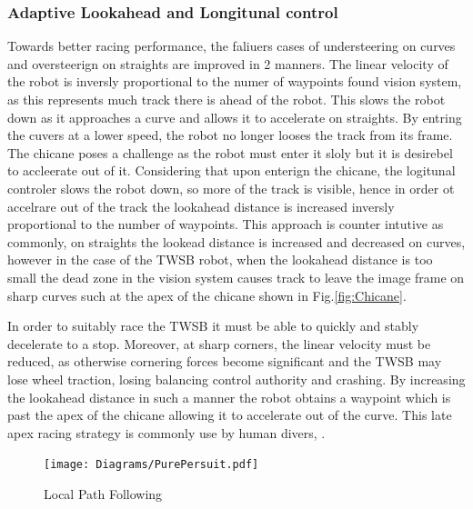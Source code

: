             \subsubsection{Adaptive Lookahead and Longitunal control}
            Towards better racing performance, the faliuers cases of understeering on curves and oversteerign on straights 
            are improved in 2 manners. The linear velocity 
            of the robot is inversly proportional to the numer of waypoints found vision system, as this represents much track there is 
            ahead of the robot.  This slows the robot down as it approaches a curve and allows it to accelerate on straights. 
            By entring the cuvers at a lower speed, the robot no longer looses the track from its frame. The chicane poses a challenge as 
            the robot must enter it sloly but it is desirebel to accleerate out of it. Considering that upon enterign the chicane, 
            the logitunal controler slows the robot down, so more of the track is visible, hence in order ot accelrare out of the track 
            the lookahead distance is increased inversly proportional to the number of waypoints. 
            This approach is counter intutive as commonly, on straights the lookead distance is increased 
            and decreased on curves, however in the case of the TWSB robot, when the lookahead distance is too small the dead zone
            in the vision system causes track to leave the image frame on sharp curves such at the apex of
            the chicane shown in Fig.\ref{fig:Chicane}.

                    
            In order to suitably race the TWSB it must be able to quickly and stably decelerate to a stop. Moreover, at sharp corners, the linear velocity must be 
            reduced, as otherwise cornering forces become significant and the TWSB may lose wheel traction, 
            losing balancing control authority and crashing. 
            By increasing the lookahead distance in such a manner  the robot obtains a waypoint which is past the apex of the chicane allowing it to accelerate out 
            of the curve. This late apex racing strategy  is commonly use by human divers, \cite{kegelman2017insights}. 


            \begin{figure}[h]
                \centering
                \texttt{[image: Diagrams/PurePersuit.pdf]}
                \caption{Local Path Following}
                \label{fig:PurePersuit}
            \end{figure}
    \pagebreak{}


